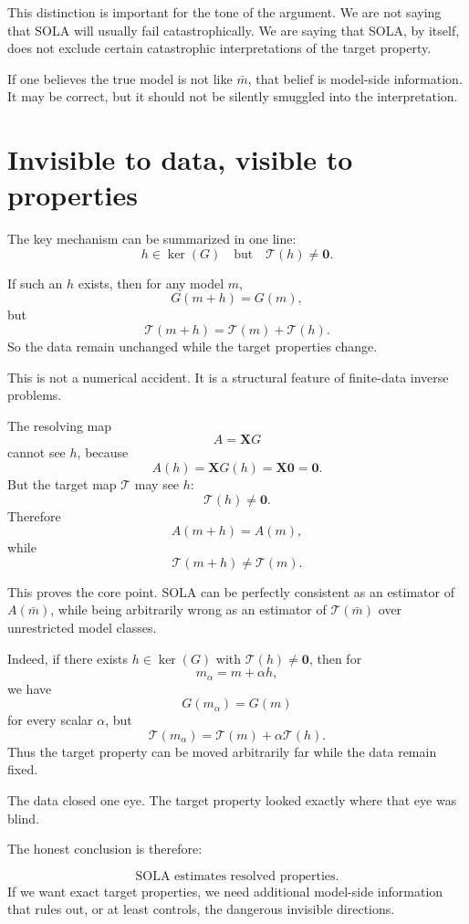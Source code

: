 \documentclass[11pt,openany]{book}
\theoremstyle{definition}
\theoremstyle{remark}
\newcommand{\Tau}{\mathcal{T}}
\newcommand{\kernel}{\operatorname{ker}}
\begin{document}
This distinction is important for the tone of the argument. We are not saying that SOLA will
usually fail catastrophically. We are saying that SOLA, by itself, does not exclude certain
catastrophic interpretations of the target property.

If one believes the true model is not like \(\bar m\), that belief is model-side information. It may
be correct, but it should not be silently smuggled into the interpretation.

\section{Invisible to data, visible to properties}

The key mechanism can be summarized in one line:
\[
  h\in\kernel(G)
  \quad\text{but}\quad
  \Tau(h)\neq\mathbf 0.
\]

If such an \(h\) exists, then for any model \(m\),
\[
  G(m+h)=G(m),
\]
but
\[
  \Tau(m+h)=\Tau(m)+\Tau(h).
\]
So the data remain unchanged while the target properties change.

This is not a numerical accident. It is a structural feature of finite-data inverse problems.

The resolving map
\[
  A=\mathbf XG
\]
cannot see \(h\), because
\[
  A(h)=\mathbf XG(h)=\mathbf X\mathbf 0=\mathbf 0.
\]
But the target map \(\Tau\) may see \(h\):
\[
  \Tau(h)\neq\mathbf 0.
\]
Therefore
\[
  A(m+h)=A(m),
\]
while
\[
  \Tau(m+h)\neq\Tau(m).
\]

This proves the core point. SOLA can be perfectly consistent as an estimator of \(A(\bar m)\),
while being arbitrarily wrong as an estimator of \(\Tau(\bar m)\) over unrestricted model classes.

Indeed, if there exists \(h\in\kernel(G)\) with \(\Tau(h)\neq\mathbf 0\), then for
\[
  m_\alpha=m+\alpha h,
\]
we have
\[
  G(m_\alpha)=G(m)
\]
for every scalar \(\alpha\), but
\[
  \Tau(m_\alpha)=\Tau(m)+\alpha\Tau(h).
\]
Thus the target property can be moved arbitrarily far while the data remain fixed.

\begin{intuitionbox}
The data closed one eye. The target property looked exactly where that eye was blind.
\end{intuitionbox}

The honest conclusion is therefore:

\[
  \text{SOLA estimates resolved properties.}
\]
If we want exact target properties, we need additional model-side information that rules out, or
at least controls, the dangerous invisible directions.
\end{document}
